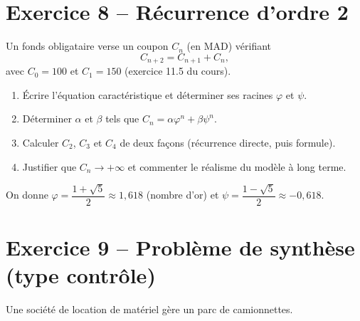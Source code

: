 \documentclass[11pt,a4paper]{article}
\begin{document}
\section*{Exercice 8 -- Récurrence d'ordre 2}

Un fonds obligataire verse un coupon $C_n$ (en MAD) vérifiant
\[
C_{n+2} = C_{n+1} + C_n,
\]
avec $C_0 = 100$ et $C_1 = 150$ (exercice 11.5 du cours).

\begin{enumerate}
  \item Écrire l'équation caractéristique et déterminer ses racines $\varphi$ et $\psi$.
  \item Déterminer $\alpha$ et $\beta$ tels que $C_n = \alpha \varphi^n + \beta \psi^n$.
  \item Calculer $C_2$, $C_3$ et $C_4$ de deux façons (récurrence directe, puis formule).
  \item Justifier que $C_n \to +\infty$ et commenter le réalisme du modèle à long terme.
\end{enumerate}

On donne $\varphi = \dfrac{1+\sqrt{5}}{2} \approx 1{,}618$ (nombre d'or) et $\psi = \dfrac{1-\sqrt{5}}{2} \approx -0{,}618$.

\section*{Exercice 9 -- Problème de synthèse (type contrôle)}

Une société de location de matériel gère un parc de camionnettes.
\end{document}
